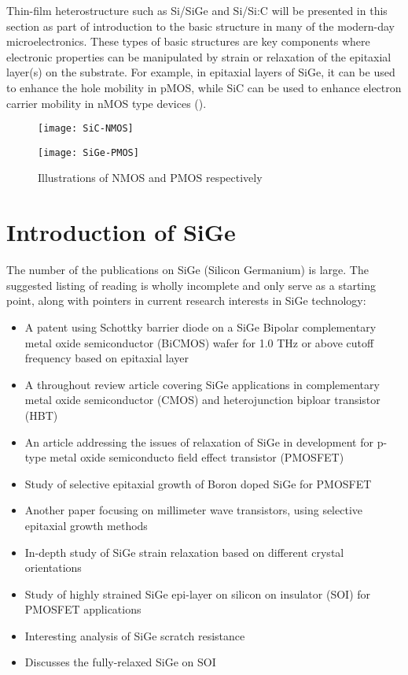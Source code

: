 Thin-film heterostructure such as Si/SiGe and Si/Si:C will be presented in this section as part of introduction to the basic structure in many of the modern-day microelectronics.  These types of basic structures are key components where electronic properties can be manipulated by strain or relaxation of the epitaxial layer(s) on the substrate.  For example, in epitaxial layers of SiGe, it can be used to enhance the hole mobility in pMOS, while SiC can be used to enhance electron carrier mobility in nMOS type devices ().

\begin{figure}[h]
\caption{Illustrations of NMOS and PMOS respectively}
\label{MOS}
\begin{minipage}{0.5\linewidth}\texttt{[image: SiC-NMOS]}\end{minipage}\begin{minipage}{0.5\linewidth}
\texttt{[image: SiGe-PMOS]}\end{minipage}\end{figure}


\section{Introduction of SiGe}

	The number of the publications on SiGe (Silicon Germanium) is large.  The suggested listing of reading is wholly incomplete and only serve as a starting point, along with pointers in current research interests in SiGe technology:

{\SingleSpacing
\begin{itemize}
\item  A patent using Schottky barrier diode on a SiGe Bipolar complementary metal oxide semiconductor (BiCMOS) wafer for 1.0 THz or above cutoff frequency based on epitaxial layer \cite{JOHNSON:2011}
\item A throughout review article covering SiGe applications in complementary metal oxide semiconductor (CMOS) and heterojunction biploar transistor (HBT)  \cite{Paul1}
\item  An article addressing the issues of relaxation of SiGe  in development for p-type metal oxide semiconducto field effect transistor (PMOSFET) \cite{Yu1}
\item Study of selective epitaxial growth of Boron doped SiGe for PMOSFET \cite{Kolahdouz1}
\item  Another paper focusing on millimeter wave transistors, using selective epitaxial growth methods \cite{Fox1}
\item In-depth study of SiGe strain relaxation based on different crystal orientations \cite{Trinkaus1}
\item Study of highly strained SiGe epi-layer on silicon on insulator (SOI) for PMOSFET applications \cite{Suh1}
\item Interesting analysis of SiGe scratch resistance \cite{Lin3} 
\item Discusses the fully-relaxed SiGe on SOI \cite{Xue1}
\end{itemize}
}

